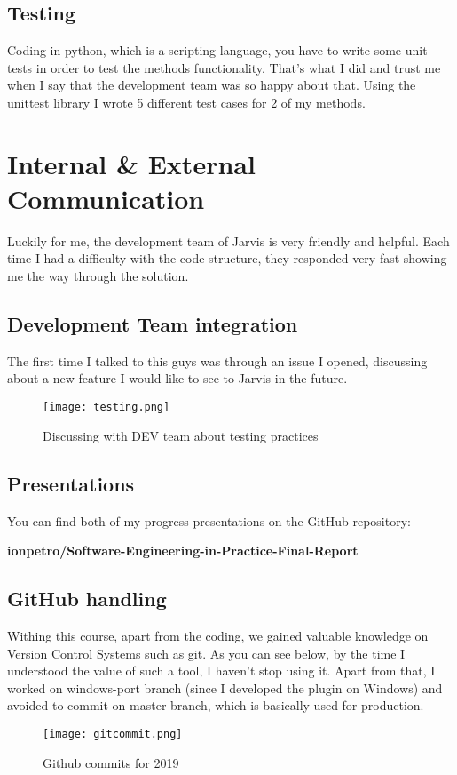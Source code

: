 \documentclass[12pt]{article}
\begin{document}
  \subsection{Testing}
  
    Coding in python, which is a scripting language, you have to write some unit tests in order to test the methods functionality. That's what I did and trust me when I say that the development team was so happy about that. Using the unittest library I wrote 5 different test cases for 2 of my methods.
  
\section{Internal \& External Communication}

    Luckily for me, the development team of Jarvis is very friendly and helpful. Each time I had a difficulty with the code structure, they responded very fast showing me the way through the solution.
 
  \subsection{Development Team integration}
  
    The first time I talked to this guys was through an issue I opened, discussing about a new feature I would like to see to Jarvis in the future.
    
\begin{figure}[tph!]
\centerline{\texttt{[image: testing.png]}}
  \caption{Discussing with DEV team about testing practices}
  \label{fig:verticalcell}
\end{figure}
  
  \subsection{Presentations}
  
  You can find both of my progress presentations on the GitHub repository: \\
  
  \centerline{
  \textbf{ionpetro/Software-Engineering-in-Practice-Final-Report} \cite{git}
  }
  
  \subsection{GitHub handling}
  
  Withing this course, apart from the coding, we gained valuable knowledge on Version Control Systems such as git. As you can see below, by the time I understood the value of such a tool, I haven't stop using it. Apart from that, I worked on windows-port branch (since I developed the plugin on Windows) and avoided to commit on master branch, which is basically used for production. 
\begin{figure}[h]
\centerline{\texttt{[image: gitcommit.png]}}
  \caption{Github commits for 2019}
  \label{fig:verticalcell}
\end{figure}
  
\end{document}
